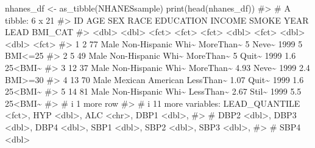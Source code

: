\documentclass[
  letterpaper,
]{krantz}
\makeatletter
\newenvironment{Shaded}{\begin{snugshade}}{\end{snugshade}}
\newcommand{\CommentTok}[1]{\textcolor[rgb]{0.37,0.37,0.37}{#1}}
\newcommand{\FunctionTok}[1]{\textcolor[rgb]{0.28,0.35,0.67}{#1}}
\newcommand{\NormalTok}[1]{\textcolor[rgb]{0.00,0.23,0.31}{#1}}
\newcommand{\OtherTok}[1]{\textcolor[rgb]{0.00,0.23,0.31}{#1}}
\newenvironment{kframe}{%
\medskip{}
\setlength{\fboxsep}{.8em}
 \def\at@end@of@kframe{}%
 \ifinner\ifhmode%
  \def\at@end@of@kframe{\end{minipage}}%
  \begin{minipage}{\columnwidth}%
 \fi\fi%
 \def\FrameCommand##1{\hskip\@totalleftmargin \hskip-\fboxsep
 \colorbox{shadecolor}{##1}\hskip-\fboxsep
     \hskip-\linewidth \hskip-\@totalleftmargin \hskip\columnwidth}%
 \MakeFramed {\advance\hsize-\width
   \@totalleftmargin\z@ \linewidth\hsize
   \@setminipage}}%
 {\par\unskip\endMakeFramed%
 \at@end@of@kframe}
\renewenvironment{Shaded}{\begin{kframe}}{\end{kframe}}
\makeatother
\begin{document}
\begin{Shaded}
\begin{Highlighting}[]
\NormalTok{nhanes\_df }\OtherTok{\textless{}{-}} \FunctionTok{as\_tibble}\NormalTok{(NHANESsample)}
\FunctionTok{print}\NormalTok{(}\FunctionTok{head}\NormalTok{(nhanes\_df))}
\CommentTok{\#\textgreater{} \# A tibble: 6 x 21}
\CommentTok{\#\textgreater{}      ID   AGE SEX   RACE              EDUCATION INCOME SMOKE  YEAR  LEAD BMI\_CAT}
\CommentTok{\#\textgreater{}   \textless{}dbl\textgreater{} \textless{}dbl\textgreater{} \textless{}fct\textgreater{} \textless{}fct\textgreater{}             \textless{}fct\textgreater{}      \textless{}dbl\textgreater{} \textless{}fct\textgreater{} \textless{}dbl\textgreater{} \textless{}dbl\textgreater{} \textless{}fct\textgreater{}  }
\CommentTok{\#\textgreater{} 1     2    77 Male  Non{-}Hispanic Whi\textasciitilde{} MoreThan\textasciitilde{}   5    Neve\textasciitilde{}  1999   5   BMI\textless{}=25}
\CommentTok{\#\textgreater{} 2     5    49 Male  Non{-}Hispanic Whi\textasciitilde{} MoreThan\textasciitilde{}   5    Quit\textasciitilde{}  1999   1.6 25\textless{}BMI\textasciitilde{}}
\CommentTok{\#\textgreater{} 3    12    37 Male  Non{-}Hispanic Whi\textasciitilde{} MoreThan\textasciitilde{}   4.93 Neve\textasciitilde{}  1999   2.4 BMI\textgreater{}=30}
\CommentTok{\#\textgreater{} 4    13    70 Male  Mexican American  LessThan\textasciitilde{}   1.07 Quit\textasciitilde{}  1999   1.6 25\textless{}BMI\textasciitilde{}}
\CommentTok{\#\textgreater{} 5    14    81 Male  Non{-}Hispanic Whi\textasciitilde{} LessThan\textasciitilde{}   2.67 Stil\textasciitilde{}  1999   5.5 25\textless{}BMI\textasciitilde{}}
\CommentTok{\#\textgreater{} \# i 1 more row}
\CommentTok{\#\textgreater{} \# i 11 more variables: LEAD\_QUANTILE \textless{}fct\textgreater{}, HYP \textless{}dbl\textgreater{}, ALC \textless{}chr\textgreater{}, DBP1 \textless{}dbl\textgreater{},}
\CommentTok{\#\textgreater{} \#   DBP2 \textless{}dbl\textgreater{}, DBP3 \textless{}dbl\textgreater{}, DBP4 \textless{}dbl\textgreater{}, SBP1 \textless{}dbl\textgreater{}, SBP2 \textless{}dbl\textgreater{}, SBP3 \textless{}dbl\textgreater{},}
\CommentTok{\#\textgreater{} \#   SBP4 \textless{}dbl\textgreater{}}
\end{Highlighting}
\end{Shaded}
\end{document}
